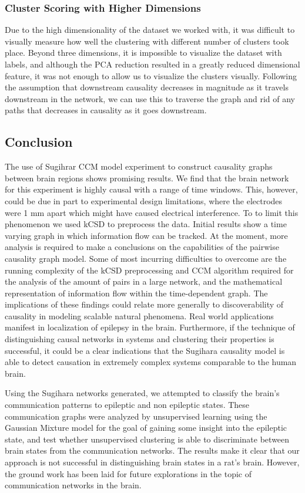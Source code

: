 \subsubsection{Cluster Scoring with Higher Dimensions}
Due to the high dimensionality of the dataset we worked with, it was difficult to visually measure how well the clustering with different number of clusters took place. Beyond three dimensions, it is impossible to visualize the dataset with labels, and although the PCA reduction resulted in a greatly reduced dimensional feature, it was not enough to allow us to visualize the clusters visually.
Following the assumption that downstream causality decreases in magnitude as it travels downstream in the network, we can use this to traverse the graph and rid of any paths that decreases in causality as it goes downstream.

\subsection{Conclusion}
The use of Sugihrar CCM model experiment to construct causality graphs between brain regions shows promising results. We find that the brain network for this experiment is highly causal with a range of time windows. This, however, could be due in part to experimental design limitations, where the electrodes were 1 mm apart which might have caused electrical interference. To to limit this phenomenon we used kCSD to preprocess the data. Initial results show a time varying graph in which information flow can be tracked. At the moment, more analysis is required to make a conclusions on the capabilities of the pairwise causality graph model. Some of most incurring difficulties to overcome are the running complexity of the kCSD preprocessing and CCM algorithm required for the analysis of the amount of pairs in a large network, and the mathematical representation of information flow within the time-dependent graph. The implications of these findings could relate more generally to discoverability of causality in modeling scalable natural phenomena. Real world applications manifest in localization of epilepsy in the brain. Furthermore, if the technique of distinguishing causal networks in systems and clustering their properties is successful, it could be a clear indications that the Sugihara causality model is able to detect causation in extremely complex systems comparable to the human brain.

Using the Sugihara networks generated, we attempted to classify the brain's communication patterns to epileptic and non epileptic states. These communication graphs were analyzed by unsupervised learning using the Gaussian Mixture model for the goal of gaining some insight into the epileptic state, and test whether unsupervised clustering is able to discriminate between brain states from the communication networks. The results make it clear that our approach is not successful in distinguishing brain states in a rat's brain. However, the ground work has been laid for future explorations in the topic of communication networks in the brain. 
